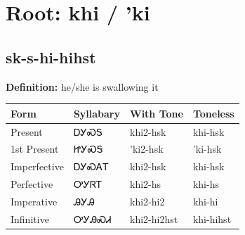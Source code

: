 \documentclass{article}%
\begin{document}
%
\normalsize%
\section*{Root: khi / 'ki}%
\subsection*{sk-s-hi-hihst}%
\textbf{Definition: }%
he/she is swallowing it%
\\[0.5em]%
\begin{tabular}{|l|l|l|l|}%
\hline%
\textbf{Form}&\textbf{Syllabary}&\textbf{With Tone}&\textbf{Toneless}\\%
\hline%
Present&ᎠᎩᏍᎦ&khi2{-}hsk&khi{-}hsk\\%
1st Present&ᏥᎩᏍᎦ&'ki2{-}hsk&'ki{-}hsk\\%
Imperfective&ᎠᎩᏍᎪᎢ&khi2{-}hsk&khi{-}hsk\\%
Perfective&ᎤᎩᏒᎢ&khi2{-}hs&khi{-}hs\\%
Imperative&ᎯᎩᎯ&khi2{-}hi2&khi{-}hi\\%
Infinitive&ᎤᎩᎯᏍᏗ&khi2{-}hi2hst&khi{-}hihst\\%
\hline%
\end{tabular}%
\\[1em]%
\end{document}
